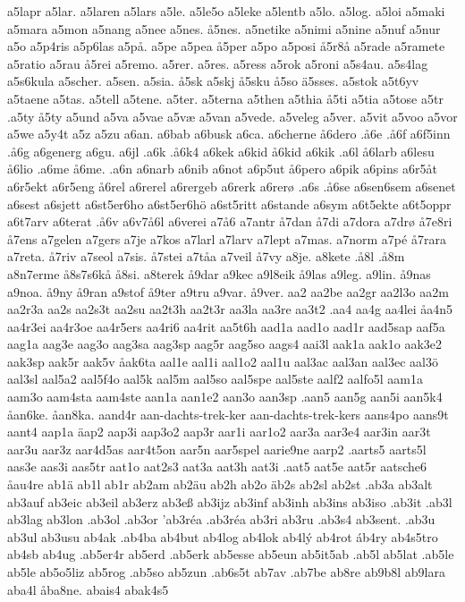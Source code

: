 a5lapr
a5lar.
a5laren
a5lars
a5le.
a5le5o
a5leke
a5lentb
a5lo.
a5log.
a5loi
a5maki
a5mara
a5mon
a5nang
a5nee
a5nes.
å5nes.
a5netike
a5nimi
a5nine
a5nuf
a5nur
a5o
a5p4ris
a5p6las
a5på.
a5pe
a5pea
å5per
a5po
a5posi
å5r8å
a5rade
a5ramete
a5ratio
a5rau
å5rei
a5remo.
a5rer.
a5res.
a5ress
a5rok
a5roni
a5s4au.
a5s4lag
a5s6kula
a5scher.
a5sen.
a5sia.
å5sk
a5skj
å5sku
å5so
ä5sses.
a5stok
a5t6yv
a5taene
a5tas.
a5tell
a5tene.
a5ter.
a5terna
a5then
a5thia
å5ti
a5tia
a5tose
a5tr
.a5ty
å5ty
a5und
a5va
a5vae
a5væ
a5van
a5vede.
a5veleg
a5ver.
a5vit
a5voo
a5vor
a5we
a5y4t
a5z
a5zu
a6an.
a6bab
a6busk
a6ca.
a6cherne
å6dero
.å6e
.å6f
a6f5inn
.å6g
a6generg
a6gu.
a6jl
.a6k
.å6k4
a6kek
a6kid
å6kid
a6kik
.a6l
å6larb
a6lesu
å6lio
.a6me
å6me.
.a6n
a6narb
a6nib
a6not
a6p5ut
å6pero
a6pik
a6pins
a6r5åt
a6r5ekt
a6r5eng
å6rel
a6rerel
a6rergeb
a6rerk
a6rerø
.a6s
.å6se
a6sen6sem
a6senet
a6sest
a6sjett
a6st5er6ho
a6st5er6hö
a6st5ritt
a6stande
a6sym
a6t5ekte
a6t5oppr
a6t7arv
a6terat
.å6v
a6v7å6l
a6verei
a7å6
a7antr
å7dan
å7di
a7dora
a7drø
å7e8ri
å7ens
a7gelen
a7gers
a7je
a7kos
a7larl
a7larv
a7lept
a7mas.
a7norm
a7pé
å7rara
a7reta.
å7riv
a7seol
a7sis.
å7stei
a7tåa
a7veil
å7vy
a8je.
a8kete
.å8l
.å8m
a8n7erme
å8s7s6kå
å8si.
a8terek
å9dar
a9kec
a9l8eik
å9las
a9leg.
a9lin.
å9nas
a9noa.
å9ny
å9ran
a9stof
å9ter
a9tru
a9var.
å9ver.
aa2
aa2be
aa2gr
aa2l3o
aa2m
aa2r3a
aa2s
aa2s3t
aa2su
aa2t3h
aa2t3r
aa3la
aa3re
aa3t2
.aa4
aa4g
aa4lei
åa4n5
aa4r3ei
aa4r3oe
aa4r5ers
aa4ri6
aa4rit
aa5t6h
aad1a
aad1o
aad1r
aad5sap
aaf5a
aag1a
aag3e
aag3o
aag3sa
aag3sp
aag5r
aag5so
aags4
aai3l
aak1a
aak1o
aak3e2
aak3sp
aak5r
aak5v
åak6ta
aal1e
aal1i
aal1o2
aal1u
aal3ac
aal3an
aal3ec
aal3ö
aal3sl
aal5a2
aal5f4o
aal5k
aal5m
aal5so
aal5spe
aal5ste
aalf2
aalfo5l
aam1a
aam3o
aam4sta
aam4ste
aan1a
aan1e2
aan3o
aan3sp
.aan5
aan5g
aan5i
aan5k4
åan6ke.
åan8ka.
aand4r
aan-dachts-trek-ker
aan-dachts-trek-kers
aans4po
aans9t
aant4
aap1a
äap2
aap3i
aap3o2
aap3r
aar1i
aar1o2
aar3a
aar3e4
aar3in
aar3t
aar3u
aar3z
aar4d5as
aar4t5on
aar5n
aar5spel
aarie9ne
aarp2
.aarts5
aarts5l
aas3e
aas3i
aas5tr
aat1o
aat2s3
aat3a
aat3h
aat3i
.aat5
aat5e
aat5r
aatsche6
åau4re
ab1ä
ab1l
ab1r
ab2am
ab2äu
ab2h
ab2o
äb2s
ab2sl
ab2st
.ab3a
ab3alt
ab3auf
ab3eic
ab3eil
ab3erz
ab3eß
ab3ijz
ab3inf
ab3inh
ab3ins
ab3iso
.ab3it
.ab3l
ab3lag
ab3lon
.ab3ol
.ab3or
'ab3réa
.ab3réa
ab3ri
ab3ru
.ab3s4
ab3sent.
.ab3u
ab3ul
ab3usu
ab4ak
.ab4ba
ab4but
ab4log
ab4lok
ab4lý
ab4rot
áb4ry
ab4s5tro
ab4sb
ab4ug
.ab5er4r
ab5erd
.ab5erk
ab5esse
ab5eun
ab5it5ab
.ab5l
ab5lat
.ab5le
ab5le
ab5o5liz
ab5rog
.ab5so
ab5zun
.ab6s5t
ab7av
.ab7be
ab8re
ab9b8l
ab9lara
aba4l
åba8ne.
abais4
abak4s5
